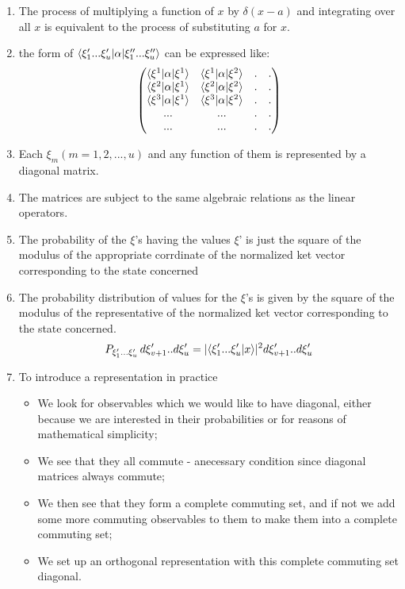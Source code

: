 \begin{enumerate}
	\item The process of multiplying a function of $x$ by $\delta(x-a)$ and integrating over all $x$ is equivalent to the process of substituting $a$ for $x$.

	\item the form of $\langle \xi'_1...\xi'_u | \alpha | \xi''_1...\xi''_u \rangle$ can be expressed like:
	\begin{equation}
	\begin{pmatrix}
	\langle \xi^1 | \alpha | \xi^1 \rangle & \langle \xi^1 | \alpha | \xi^2 \rangle & . & . \\
	\langle \xi^2 | \alpha | \xi^1 \rangle & \langle \xi^2 | \alpha | \xi^2 \rangle & . & . \\
	\langle \xi^3 | \alpha | \xi^1 \rangle & \langle \xi^3 | \alpha | \xi^2 \rangle & . & .
	\\
	. . . & . . . &  . & . \\
	. . . & . . . &  . & . 
	\end{pmatrix}
	\end{equation}
	\item Each $\xi_m ( m= 1,2,...,u)$ and any function of them is represented by a diagonal matrix.

	\item The matrices are subject to the same algebraic relations as the linear operators.

	\item The probability of the $\xi$'s having the values $\xi$' is just the square of the modulus of the appropriate corrdinate of the normalized ket vector corresponding to the state concerned

	\item The probability distribution of values for the $\xi$'s is given by the square of the modulus of the representative of the normalized ket vector corresponding to the state concerned.
	\begin{equation}
	P_{\xi'_1...\xi'_u} \, d\xi'_{v+1}..d\xi'_u = |\langle \xi_1'...\xi'_u | x \rangle|^2 d\xi'_{v+1}..d\xi'_u
	\label{probabilitydistribution}
	\end{equation}

	\item To introduce a representation in practice
		\begin{itemize}
		\item We look for observables which we would like to have diagonal, either because we are interested in their probabilities or for reasons of mathematical simplicity;
		\item We see that they all commute - anecessary condition since diagonal matrices always commute;
		\item We then see that they form a complete commuting set, and if not we add some more commuting observables to them to make them into a complete commuting set;
		\item We set up an orthogonal representation with this complete commuting set diagonal.
	\end{itemize}


\end{enumerate}
